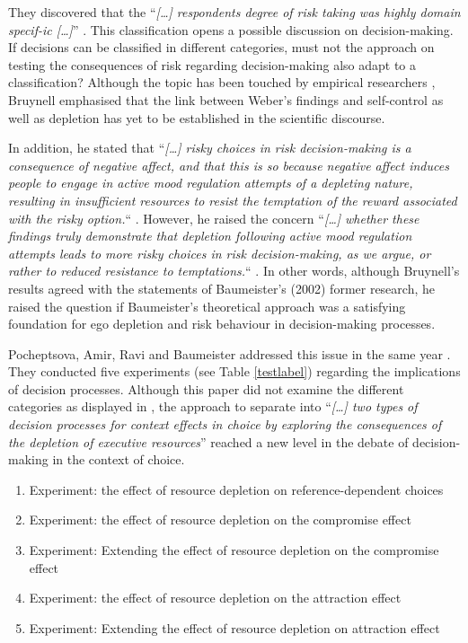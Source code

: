 They discovered that the “\emph{[\ldots] respondents degree of risk taking was highly domain specif-ic [\ldots]}” \citep[p.~263]{weber2002domain}. This classification opens a possible discussion on decision-making. If decisions can be classified in different categories, must not the approach on testing the consequences of risk regarding decision-making also adapt to a classification? Although the topic has been touched by empirical researchers \citep{ditto2006visceral}, Bruynell \citep{bruyneel2009felt} emphasised that the link between Weber’s findings and self-control as well as depletion has yet to be established in the scientific discourse.\par
In addition, he stated that “\emph{[\ldots] risky choices in risk decision-making is a consequence of negative affect, and that this is so because negative affect induces people to engage in active mood regulation attempts of a depleting nature, resulting in insufficient resources to resist the temptation of the reward associated with the risky option.}“ \citep[p.~165]{bruyneel2009felt}. However, he raised the concern “\emph{[\ldots] whether these findings truly demonstrate that depletion following active mood regulation attempts leads to more risky choices in risk decision-making, as we argue, or rather to reduced resistance to temptations.}“ \citep[p.~165]{bruyneel2009felt}. In other words, although Bruynell’s results agreed with the statements of Baumeister’s (2002) former research, he raised the question if Baumeister’s theoretical approach was a satisfying foundation for ego depletion and risk behaviour in decision-making processes.\par
Pocheptsova, Amir, Ravi and Baumeister addressed this issue in the same year \citep{pocheptsova2009deciding}. They conducted five experiments (see Table \ref{testlabel}) regarding the implications of decision processes. Although this paper did not examine the different categories as displayed in \citep{weber2002domain}, the approach to separate into “\emph{[\ldots] two types of decision processes for context effects in choice by exploring the consequences of the depletion of executive resources}” \citep{pocheptsova2009deciding} reached a new level in the debate of decision-making in the context of choice.
\begin{enumerate}[1.]
	\item Experiment: the effect of resource depletion on reference-dependent choices
	\item Experiment: the effect of resource depletion on the compromise effect
	\item Experiment: Extending the effect of resource depletion on the compromise effect
	\item Experiment: the effect of resource depletion on the attraction effect
	\item Experiment: Extending the effect of resource depletion on attraction effect
\label{testlabel}
\end{enumerate}
